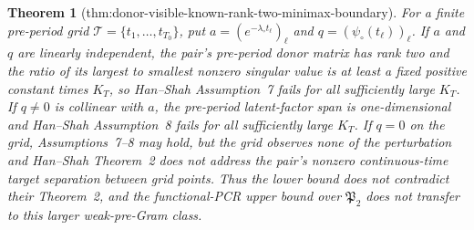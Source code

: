 \documentclass{article}
\newtheorem{theorem}{Theorem}
\begin{document}
\begin{theorem}[thm:donor-visible-known-rank-two-minimax-boundary]
For a finite pre-period grid \(\mathcal T=\{t_1,\ldots,t_{T_0}\}\), put \(a=(e^{-\lambda_\circ t_\ell})_\ell\) and \(q=(\psi_\circ(t_\ell))_\ell\).  If \(a\) and \(q\) are linearly independent, the pair's pre-period donor matrix has rank two and the ratio of its largest to smallest nonzero singular value is at least a fixed positive constant times \(K_T\), so Han--Shah Assumption~7 fails for all sufficiently large \(K_T\).  If \(q\ne0\) is collinear with \(a\), the pre-period latent-factor span is one-dimensional and Han--Shah Assumption~8 fails for all sufficiently large \(K_T\).  If \(q=0\) on the grid, Assumptions~7--8 may hold, but the grid observes none of the perturbation and Han--Shah Theorem~2 does not address the pair's nonzero continuous-time target separation between grid points.  Thus the lower bound does not contradict their Theorem~2, and the functional-PCR upper bound over \(\mathfrak P_2\) does not transfer to this larger weak-pre-Gram class.
\end{theorem}
\end{document}
